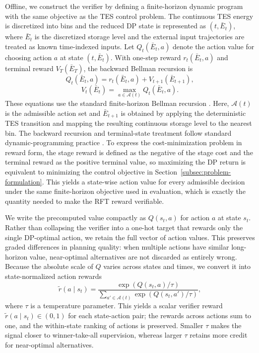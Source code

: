 \documentclass[11pt]{article}
\begin{document}
Offline, we construct the verifier by defining a finite-horizon dynamic program with the same objective as the TES control problem. The continuous TES energy is discretized into bins and the reduced DP state is represented as $(t,\bar E_t)$, where $\bar E_t$ is the discretized storage level and the external input trajectories are treated as known time-indexed inputs. Let $Q_t(\bar E_t,a)$ denote the action value for choosing action $a$ at state $(t,\bar E_t)$. With one-step reward $r_t(\bar E_t,a)$ and terminal reward $V_T(\bar E_T)$, the backward Bellman recursion is
\begin{equation}
Q_t(\bar E_t,a)=r_t(\bar E_t,a)+V_{t+1}(\bar E_{t+1}),
\end{equation}
\begin{equation}
V_t(\bar E_t)=\max_{a\in\mathcal{A}(t)} Q_t(\bar E_t,a).
\end{equation}
These equations use the standard finite-horizon Bellman recursion \cite{puterman_mdp_2005}. Here, $\mathcal{A}(t)$ is the admissible action set and $\bar E_{t+1}$ is obtained by applying the deterministic TES transition and mapping the resulting continuous storage level to the nearest bin. The backward recursion and terminal-state treatment follow standard dynamic-programming practice \cite{bertsekas_dpoc_vols_2012_2017}. To express the cost-minimization problem in reward form, the stage reward is defined as the negative of the stage cost and the terminal reward as the positive terminal value, so maximizing the DP return is equivalent to minimizing the control objective in Section~\ref{subsec:problem-formulation}. This yields a state-wise action value for every admissible decision under the same finite-horizon objective used in evaluation, which is exactly the quantity needed to make the RFT reward verifiable.

We write the precomputed value compactly as $Q(s_t,a)$ for action $a$ at state $s_t$. Rather than collapsing the verifier into a one-hot target that rewards only the single DP-optimal action, we retain the full vector of action values. This preserves graded differences in planning quality: when multiple actions have similar long-horizon value, near-optimal alternatives are not discarded as entirely wrong. Because the absolute scale of $Q$ varies across states and times, we convert it into state-normalized action rewards
\begin{equation}
\tilde r(a \mid s_t)=\frac{\exp(Q(s_t,a)/\tau)}{\sum_{a'\in\mathcal{A}(t)}\exp(Q(s_t,a')/\tau)},
\end{equation}
where $\tau$ is a temperature parameter. This yields a scalar verifier reward $\tilde r(a \mid s_t)\in(0,1)$ for each state-action pair; the rewards across actions sum to one, and the within-state ranking of actions is preserved. Smaller $\tau$ makes the signal closer to winner-take-all supervision, whereas larger $\tau$ retains more credit for near-optimal alternatives.
\end{document}
